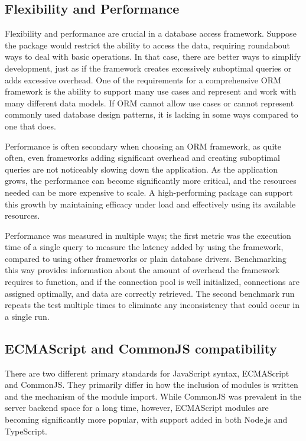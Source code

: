\subsection{Flexibility and Performance}

Flexibility and performance are crucial in a database access framework. Suppose
the package would restrict the ability to access the data, requiring roundabout
ways to deal with basic operations. In that case, there are better ways to
simplify development, just as if the framework creates excessively suboptimal
queries or adds excessive overhead. One of the requirements for a comprehensive
ORM framework is the ability to support many use cases and represent and work
with many different data models. If ORM cannot allow use cases or cannot
represent commonly used database design patterns, it is lacking in some ways
compared to one that does.

Performance is often secondary when choosing an ORM framework, as quite often,
even frameworks adding significant overhead and creating suboptimal queries are
not noticeably slowing down the application. As the application grows, the
performance can become significantly more critical, and the resources needed can
be more expensive to scale. A high-performing package can support this growth by
maintaining efficacy under load and effectively using its available resources.

Performance was measured in multiple ways; the first metric was the execution
time of a single query to measure the latency added by using the framework,
compared to using other frameworks or plain database drivers. Benchmarking this
way provides information about the amount of overhead the framework requires to
function, and if the connection pool is well initialized, connections are
assigned optimally, and data are correctly retrieved. The second benchmark run
repeats the test multiple times to eliminate any inconsistency that could occur
in a single run.

\subsection{ECMAScript and CommonJS compatibility}
There are two different primary standards for JavaScript syntax, ECMAScript and
CommonJS. They primarily differ in how the inclusion of modules is written and
the mechanism of the module import. While CommonJS was prevalent in the server
backend space for a long time, however, ECMAScript modules are becoming
significantly more popular, with support added in both Node.js and TypeScript.

